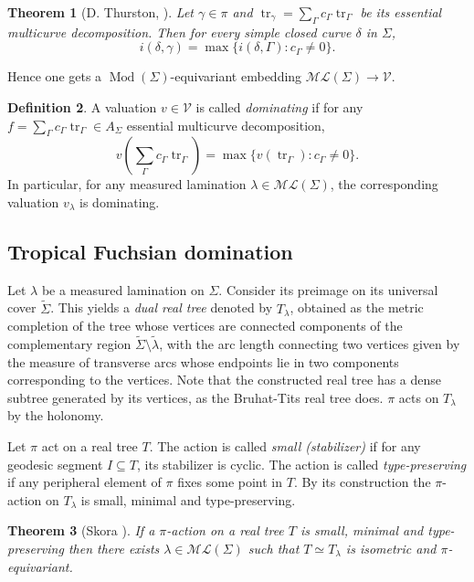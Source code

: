 \documentclass[11pt]{amsart}
\newtheorem{theorem}{Theorem}
\numberwithin{theorem}{section}
\theoremstyle{definition}
\newtheorem{definition}[theorem]{Definition}
\theoremstyle{remark}
\newcommand{\Vcal}{{\mathcal{V}}}
\DeclareMathOperator{\Mod}{Mod}
\DeclareMathOperator{\tr}{tr}
\newcommand{\<}{\langle}
\renewcommand{\>}{\rangle}
\begin{document}
\begin{theorem}[D. Thurston, \cite{thurston2008geometric}]
    Let $\gamma \in \pi$ and $\tr_\gamma = \sum_{\Gamma} c_{\Gamma} \tr_{\Gamma}$ be its essential multicurve decomposition. Then for every simple closed curve $\delta$ in $\Sigma$,
    \[
    i(\delta, \gamma) = \max \{ i(\delta, \Gamma) : c_{\Gamma} \neq 0 \}.
    \]
\end{theorem}

Hence one gets a $\Mod(\Sigma)$-equivariant embedding $\mathcal{ML}(\Sigma) \rightarrow \Vcal$. 

\begin{definition}
    A valuation $v \in \Vcal$ is called \textit{dominating} if for any $f = \sum_{\Gamma} c_{\Gamma}\tr_{\Gamma} \in A_\Sigma$ essential multicurve decomposition,
        \[
        v\left(\sum_{\Gamma} c_{\Gamma} \tr_{\Gamma}\right) = \max \{ v(\tr_{\Gamma}) : c_{\Gamma} \neq 0 \}.
        \]
    In particular, for any measured lamination $\lambda \in \mathcal{ML}(\Sigma)$, the corresponding valuation $v_\lambda$ is dominating.
\end{definition}



\subsection{Tropical Fuchsian domination}

Let $\lambda$ be a measured lamination on $\Sigma$. Consider its preimage on its universal cover $\widetilde{\Sigma}$. This yields a \textit{dual real tree} denoted by $T_\lambda$, obtained as the metric completion of the tree whose vertices are connected components of the complementary region $\widetilde{\Sigma} \setminus \widetilde{\lambda}$, with the arc length connecting two vertices given by the measure of transverse arcs whose endpoints lie in two components corresponding to the vertices. Note that the constructed real tree has a dense subtree generated by its vertices, as the Bruhat-Tits real tree does. $\pi$ acts on $T_\lambda$ by the holonomy.

Let $\pi$ act on a real tree $T$. The action is called \textit{small (stabilizer)} if for any geodesic segment $I \subseteq T$, its stabilizer is cyclic. The action is called \textit{type-preserving} if any peripheral element of $\pi$ fixes some point in $T$. By its construction the $\pi$-action on $T_\lambda$ is small, minimal and type-preserving.

\begin{theorem}[Skora \cite{skora1996splittings}]
    If a $\pi$-action on a real tree $T$ is small, minimal and type-preserving then there exists $\lambda \in \mathcal{ML}(\Sigma)$ such that $T \simeq T_\lambda$ is isometric and $\pi$-equivariant.
\end{theorem}
\end{document}
